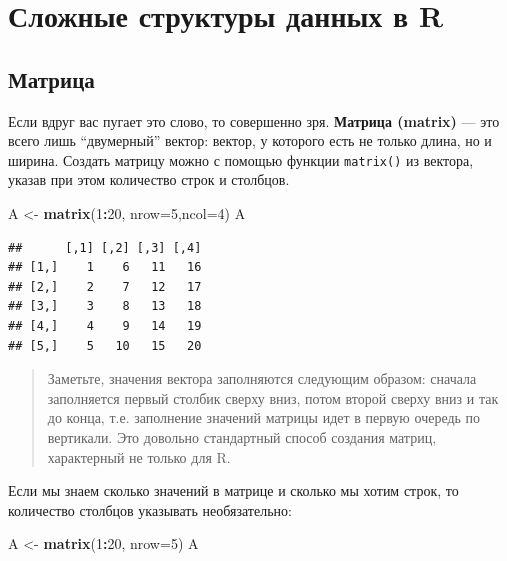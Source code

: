 \documentclass[]{book}
\newenvironment{Shaded}{\begin{snugshade}}{\end{snugshade}}
\newcommand{\KeywordTok}[1]{\textcolor[rgb]{0.13,0.29,0.53}{\textbf{#1}}}
\newcommand{\DataTypeTok}[1]{\textcolor[rgb]{0.13,0.29,0.53}{#1}}
\newcommand{\DecValTok}[1]{\textcolor[rgb]{0.00,0.00,0.81}{#1}}
\newcommand{\StringTok}[1]{\textcolor[rgb]{0.31,0.60,0.02}{#1}}
\newcommand{\OperatorTok}[1]{\textcolor[rgb]{0.81,0.36,0.00}{\textbf{#1}}}
\newcommand{\NormalTok}[1]{#1}
\begin{document}
\chapter{Сложные структуры данных в R}\label{complex_structures}

\section{Матрица}\label{matrix}

Если вдруг вас пугает это слово, то совершенно зря. \textbf{Матрица
(matrix)} --- это всего лишь ``двумерный'' вектор: вектор, у которого
есть не только длина, но и ширина. Создать матрицу можно с помощью
функции \texttt{matrix()} из вектора, указав при этом количество строк и
столбцов.

\begin{Shaded}
\begin{Highlighting}[]
\NormalTok{A <-}\StringTok{ }\KeywordTok{matrix}\NormalTok{(}\DecValTok{1}\OperatorTok{:}\DecValTok{20}\NormalTok{, }\DataTypeTok{nrow=}\DecValTok{5}\NormalTok{,}\DataTypeTok{ncol=}\DecValTok{4}\NormalTok{)}
\NormalTok{A}
\end{Highlighting}
\end{Shaded}

\begin{verbatim}
##      [,1] [,2] [,3] [,4]
## [1,]    1    6   11   16
## [2,]    2    7   12   17
## [3,]    3    8   13   18
## [4,]    4    9   14   19
## [5,]    5   10   15   20
\end{verbatim}

\begin{quote}
Заметьте, значения вектора заполняются следующим образом: сначала
заполняется первый столбик сверху вниз, потом второй сверху вниз и так
до конца, т.е. заполнение значений матрицы идет в первую очередь по
вертикали. Это довольно стандартный способ создания матриц, характерный
не только для R.
\end{quote}

Если мы знаем сколько значений в матрице и сколько мы хотим строк, то
количество столбцов указывать необязательно:

\begin{Shaded}
\begin{Highlighting}[]
\NormalTok{A <-}\StringTok{ }\KeywordTok{matrix}\NormalTok{(}\DecValTok{1}\OperatorTok{:}\DecValTok{20}\NormalTok{, }\DataTypeTok{nrow=}\DecValTok{5}\NormalTok{)}
\NormalTok{A}
\end{Highlighting}
\end{Shaded}
\end{document}
